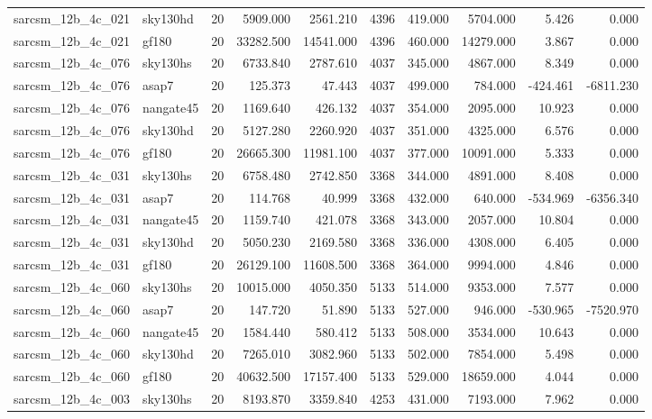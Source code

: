 \documentclass{article}
\begin{document}
\begin{longtable}{llrrrrrrrr}
sarcsm\_12b\_4c\_021 & sky130hd & 20 & 5909.000 & 2561.210 & 4396 & 419.000 & 5704.000 & 5.426 & 0.000 \\
sarcsm\_12b\_4c\_021 & gf180 & 20 & 33282.500 & 14541.000 & 4396 & 460.000 & 14279.000 & 3.867 & 0.000 \\
sarcsm\_12b\_4c\_076 & sky130hs & 20 & 6733.840 & 2787.610 & 4037 & 345.000 & 4867.000 & 8.349 & 0.000 \\
sarcsm\_12b\_4c\_076 & asap7 & 20 & 125.373 & 47.443 & 4037 & 499.000 & 784.000 & -424.461 & -6811.230 \\
sarcsm\_12b\_4c\_076 & nangate45 & 20 & 1169.640 & 426.132 & 4037 & 354.000 & 2095.000 & 10.923 & 0.000 \\
sarcsm\_12b\_4c\_076 & sky130hd & 20 & 5127.280 & 2260.920 & 4037 & 351.000 & 4325.000 & 6.576 & 0.000 \\
sarcsm\_12b\_4c\_076 & gf180 & 20 & 26665.300 & 11981.100 & 4037 & 377.000 & 10091.000 & 5.333 & 0.000 \\
sarcsm\_12b\_4c\_031 & sky130hs & 20 & 6758.480 & 2742.850 & 3368 & 344.000 & 4891.000 & 8.408 & 0.000 \\
sarcsm\_12b\_4c\_031 & asap7 & 20 & 114.768 & 40.999 & 3368 & 432.000 & 640.000 & -534.969 & -6356.340 \\
sarcsm\_12b\_4c\_031 & nangate45 & 20 & 1159.740 & 421.078 & 3368 & 343.000 & 2057.000 & 10.804 & 0.000 \\
sarcsm\_12b\_4c\_031 & sky130hd & 20 & 5050.230 & 2169.580 & 3368 & 336.000 & 4308.000 & 6.405 & 0.000 \\
sarcsm\_12b\_4c\_031 & gf180 & 20 & 26129.100 & 11608.500 & 3368 & 364.000 & 9994.000 & 4.846 & 0.000 \\
sarcsm\_12b\_4c\_060 & sky130hs & 20 & 10015.000 & 4050.350 & 5133 & 514.000 & 9353.000 & 7.577 & 0.000 \\
sarcsm\_12b\_4c\_060 & asap7 & 20 & 147.720 & 51.890 & 5133 & 527.000 & 946.000 & -530.965 & -7520.970 \\
sarcsm\_12b\_4c\_060 & nangate45 & 20 & 1584.440 & 580.412 & 5133 & 508.000 & 3534.000 & 10.643 & 0.000 \\
sarcsm\_12b\_4c\_060 & sky130hd & 20 & 7265.010 & 3082.960 & 5133 & 502.000 & 7854.000 & 5.498 & 0.000 \\
sarcsm\_12b\_4c\_060 & gf180 & 20 & 40632.500 & 17157.400 & 5133 & 529.000 & 18659.000 & 4.044 & 0.000 \\
sarcsm\_12b\_4c\_003 & sky130hs & 20 & 8193.870 & 3359.840 & 4253 & 431.000 & 7193.000 & 7.962 & 0.000 \\

\end{longtable}
\end{document}
